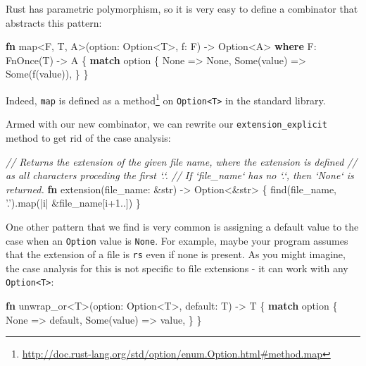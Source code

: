 \documentclass[a4paper,]{book}
\newenvironment{Shaded}{\begin{snugshade}}{\end{snugshade}}
\newcommand{\KeywordTok}[1]{\textcolor[rgb]{0.13,0.29,0.53}{\textbf{{#1}}}}
\newcommand{\DataTypeTok}[1]{\textcolor[rgb]{0.13,0.29,0.53}{{#1}}}
\newcommand{\DecValTok}[1]{\textcolor[rgb]{0.00,0.00,0.81}{{#1}}}
\newcommand{\ConstantTok}[1]{\textcolor[rgb]{0.00,0.00,0.00}{{#1}}}
\newcommand{\CharTok}[1]{\textcolor[rgb]{0.31,0.60,0.02}{{#1}}}
\newcommand{\CommentTok}[1]{\textcolor[rgb]{0.56,0.35,0.01}{\textit{{#1}}}}
\newcommand{\BuiltInTok}[1]{{#1}}
\newcommand{\NormalTok}[1]{{#1}}
\renewcommand{\href}[2]{#2\footnote{\url{#1}}}
\begin{document}
Rust has parametric polymorphism, so it is very easy to define a
combinator that abstracts this pattern:


\begin{Shaded}
\begin{Highlighting}[]
\KeywordTok{fn} \NormalTok{map<F, T, A>(option: }\DataTypeTok{Option}\NormalTok{<T>, f: F) -> }\DataTypeTok{Option}\NormalTok{<A> }\KeywordTok{where} \NormalTok{F: }\BuiltInTok{FnOnce}\NormalTok{(T) -> A \{}
    \KeywordTok{match} \NormalTok{option \{}
        \ConstantTok{None} \NormalTok{=> }\ConstantTok{None}\NormalTok{,}
        \ConstantTok{Some}\NormalTok{(value) => }\ConstantTok{Some}\NormalTok{(f(value)),}
    \NormalTok{\}}
\NormalTok{\}}
\end{Highlighting}
\end{Shaded}

Indeed, \texttt{map} is
\href{http://doc.rust-lang.org/std/option/enum.Option.html\#method.map}{defined
as a method} on \texttt{Option\textless{}T\textgreater{}} in the
standard library.

Armed with our new combinator, we can rewrite our
\texttt{extension\_explicit} method to get rid of the case analysis:

\begin{Shaded}
\begin{Highlighting}[]
\CommentTok{// Returns the extension of the given file name, where the extension is defined}
\CommentTok{// as all characters proceding the first `.`.}
\CommentTok{// If `file_name` has no `.`, then `None` is returned.}
\KeywordTok{fn} \NormalTok{extension(file_name: &}\DataTypeTok{str}\NormalTok{) -> }\DataTypeTok{Option}\NormalTok{<&}\DataTypeTok{str}\NormalTok{> \{}
    \NormalTok{find(file_name, }\CharTok{'.'}\NormalTok{).map(|i| &file_name[i+}\DecValTok{1.}\NormalTok{.])}
\NormalTok{\}}
\end{Highlighting}
\end{Shaded}

One other pattern that we find is very common is assigning a default
value to the case when an \texttt{Option} value is \texttt{None}. For
example, maybe your program assumes that the extension of a file is
\texttt{rs} even if none is present. As you might imagine, the case
analysis for this is not specific to file extensions - it can work with
any \texttt{Option\textless{}T\textgreater{}}:

\begin{Shaded}
\begin{Highlighting}[]
\KeywordTok{fn} \NormalTok{unwrap_or<T>(option: }\DataTypeTok{Option}\NormalTok{<T>, default: T) -> T \{}
    \KeywordTok{match} \NormalTok{option \{}
        \ConstantTok{None} \NormalTok{=> default,}
        \ConstantTok{Some}\NormalTok{(value) => value,}
    \NormalTok{\}}
\NormalTok{\}}
\end{Highlighting}
\end{Shaded}
\end{document}

